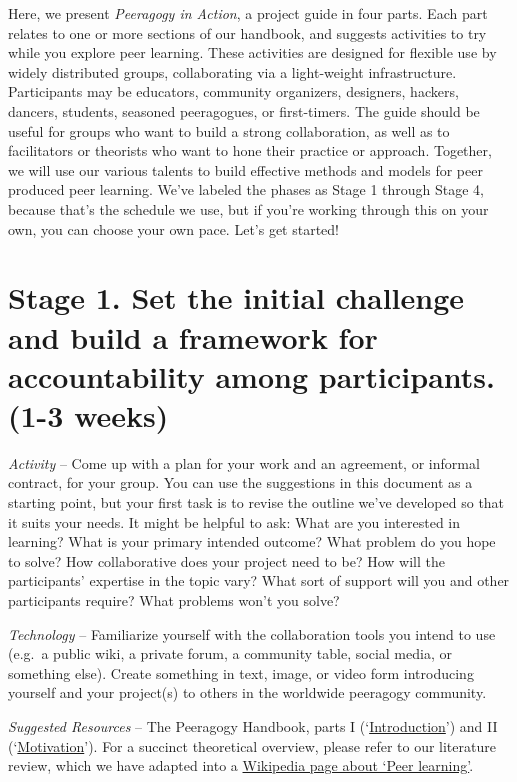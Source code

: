 Here, we present \emph{Peeragogy in Action}, a project guide in four
parts. Each part relates to one or more sections of our handbook, and
suggests activities to try while you explore peer learning. These
activities are designed for flexible use by widely distributed groups,
collaborating via a light-weight infrastructure. Participants may be
educators, community organizers, designers, hackers, dancers, students,
seasoned peeragogues, or first-timers. The guide should be useful for
groups who want to build a strong collaboration, as well as to
facilitators or theorists who want to hone their practice or approach.
Together, we will use our various talents to build effective methods and
models for peer produced peer learning. We've labeled the phases as
Stage 1 through Stage 4, because that's the schedule we use, but if
you're working through this on your own, you can choose your own pace.
Let's get started!

\hypertarget{stage-1.-set-the-initial-challenge-and-build-a-framework-for-accountability-among-participants.-1-3-weeks}{%
\section{Stage 1. Set the initial challenge and build a framework for
accountability among participants. (1-3
weeks)}\label{stage-1.-set-the-initial-challenge-and-build-a-framework-for-accountability-among-participants.-1-3-weeks}}

\emph{Activity} -- Come up with a plan for your work and an agreement,
or informal contract, for your group. You can use the suggestions in
this document as a starting point, but your first task is to revise the
outline we've developed so that it suits your needs. It might be helpful
to ask: What are you interested in learning? What is your primary
intended outcome? What problem do you hope to solve? How collaborative
does your project need to be? How will the participants' expertise in
the topic vary? What sort of support will you and other participants
require? What problems won't you solve?

\emph{Technology} -- Familiarize yourself with the collaboration tools
you intend to use (e.g.~a public wiki, a private forum, a community
table, social media, or something else). Create something in text,
image, or video form introducing yourself and your project(s) to others
in the worldwide peeragogy community.

\emph{Suggested Resources} -- The Peeragogy Handbook, parts I
(`\href{http://peeragogy.org/}{Introduction}') and II
(`\href{http://peeragogy.org/motivation/}{Motivation}'). For a succinct
theoretical overview, please refer to our literature review, which we
have adapted into a
\href{http://en.wikipedia.org/wiki/Peer_learning}{Wikipedia page about
`Peer learning'}.

